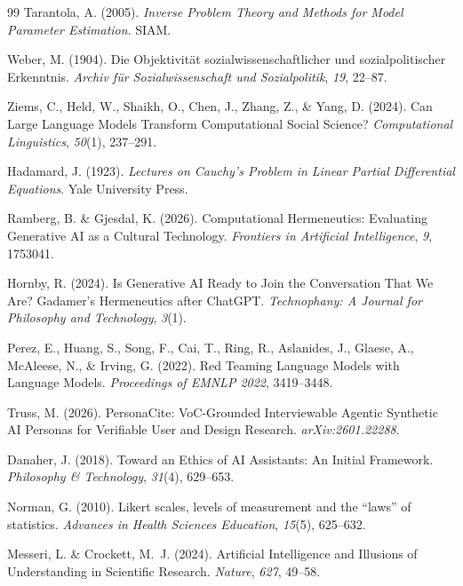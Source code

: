 \documentclass[11pt,a4paper]{article}
\theoremstyle{definition}
\theoremstyle{plain}
\theoremstyle{remark}
\begin{document}
\begin{thebibliography}{99}
  Tarantola, A. (2005).
  \textit{Inverse Problem Theory and Methods for Model Parameter Estimation}.
  SIAM.

  Weber, M. (1904).
  Die \glqq Objektivit\"at\grqq{} sozialwissenschaftlicher und sozialpolitischer Erkenntnis.
  \textit{Archiv f\"ur Sozialwissenschaft und Sozialpolitik}, \textit{19}, 22--87.

  Ziems, C., Held, W., Shaikh, O., Chen, J., Zhang, Z., \& Yang, D. (2024).
  Can Large Language Models Transform Computational Social Science?
  \textit{Computational Linguistics}, \textit{50}(1), 237--291.

  Hadamard, J. (1923).
  \textit{Lectures on Cauchy's Problem in Linear Partial Differential Equations}.
  Yale University Press.

  Ramberg, B. \& Gjesdal, K. (2026).
  Computational Hermeneutics: Evaluating Generative AI as a Cultural Technology.
  \textit{Frontiers in Artificial Intelligence}, \textit{9}, 1753041.

  Hornby, R. (2024).
  Is Generative AI Ready to Join the Conversation That We Are? Gadamer's Hermeneutics after ChatGPT.
  \textit{Technophany: A Journal for Philosophy and Technology}, \textit{3}(1).

  Perez, E., Huang, S., Song, F., Cai, T., Ring, R., Aslanides, J., Glaese, A., McAleese, N., \& Irving, G. (2022).
  Red Teaming Language Models with Language Models.
  \textit{Proceedings of EMNLP 2022}, 3419--3448.

  Truss, M. (2026).
  PersonaCite: VoC-Grounded Interviewable Agentic Synthetic AI Personas for Verifiable User and Design Research.
  \textit{arXiv:2601.22288}.

  Danaher, J. (2018).
  Toward an Ethics of AI Assistants: An Initial Framework.
  \textit{Philosophy \& Technology}, \textit{31}(4), 629--653.

  Norman, G. (2010).
  Likert scales, levels of measurement and the ``laws'' of statistics.
  \textit{Advances in Health Sciences Education}, \textit{15}(5), 625--632.

  Messeri, L. \& Crockett, M.~J. (2024).
  Artificial Intelligence and Illusions of Understanding in Scientific Research.
  \textit{Nature}, \textit{627}, 49--58.


\end{thebibliography}
\end{document}
